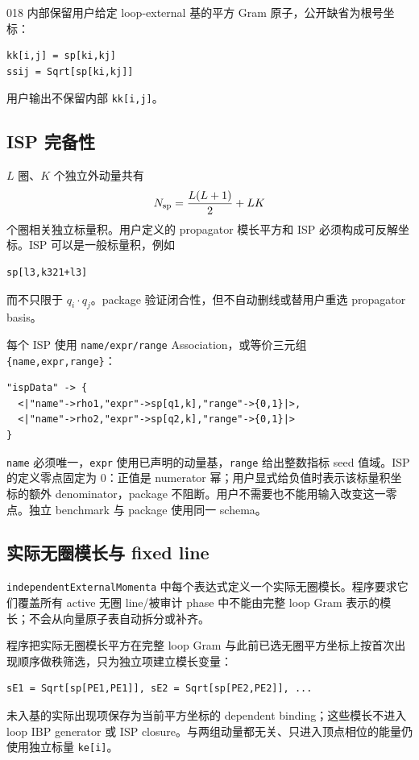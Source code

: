 ﻿\documentclass[a4paper,11pt]{article}
\begin{document}
018 内部保留用户给定 loop-external 基的平方 Gram 原子，公开缺省为根号坐标：
\begin{verbatim}
kk[i,j] = sp[ki,kj]
ssij = Sqrt[sp[ki,kj]]
\end{verbatim}
用户输出不保留内部 \texttt{kk[i,j]}。

\subsection{ISP 完备性}

$L$ 圈、$K$ 个独立外动量共有
\begin{equation}
 N_{\rm sp}=\frac{L(L+1)}2+LK
\end{equation}
个圈相关独立标量积。用户定义的 propagator 模长平方和 ISP 必须构成可反解坐标。ISP 可以是一般标量积，例如
\begin{verbatim}
sp[l3,k321+l3]
\end{verbatim}
而不只限于 $q_i\cdot q_j$。package 验证闭合性，但不自动删线或替用户重选 propagator basis。

每个 ISP 使用 \texttt{name/expr/range} Association，或等价三元组 \texttt{\{name,expr,range\}}：
\begin{verbatim}
"ispData" -> {
  <|"name"->rho1,"expr"->sp[q1,k],"range"->{0,1}|>,
  <|"name"->rho2,"expr"->sp[q2,k],"range"->{0,1}|>
}
\end{verbatim}
\texttt{name} 必须唯一，\texttt{expr} 使用已声明的动量基，\texttt{range} 给出整数指标 seed 值域。ISP 的定义零点固定为 $0$：正值是 numerator 幂；用户显式给负值时表示该标量积坐标的额外 denominator，package 不阻断。用户不需要也不能用输入改变这一零点。独立 benchmark 与 package 使用同一 schema。

\subsection{实际无圈模长与 fixed line}

\texttt{independentExternal\allowbreak Momenta} 中每个表达式定义一个实际无圈模长。程序要求它们覆盖所有 active 无圈 line/被审计 phase 中不能由完整 loop Gram 表示的模长；不会从向量原子表自动拆分或补齐。

程序把实际无圈模长平方在完整 loop Gram 与此前已选无圈平方坐标上按首次出现顺序做秩筛选，只为独立项建立模长变量：
\begin{verbatim}
sE1 = Sqrt[sp[PE1,PE1]], sE2 = Sqrt[sp[PE2,PE2]], ...
\end{verbatim}
未入基的实际出现项保存为当前平方坐标的 dependent binding；这些模长不进入 loop IBP generator 或 ISP closure。与两组动量都无关、只进入顶点相位的能量仍使用独立标量 \texttt{ke[i]}。
\end{document}
